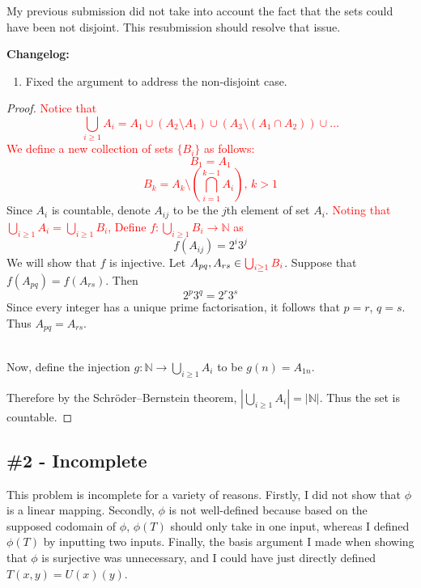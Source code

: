 \documentclass{article}
\theoremstyle{plain} %
\numberwithin{thm}{section} %
\theoremstyle{definition}
\begin{document}
    \smallskip

    \noindent My previous submission did not take into account the fact that the sets could have been not disjoint. This resubmission should resolve that issue.


    \noindent\textbf{Changelog:}\begin{enumerate}
        \item Fixed the argument to address the non-disjoint case.
    \end{enumerate}

    \begin{proof}
        \textcolor{red}{Notice that \[\bigcup_{i \ge 1} A_i = A_1 \cup (A_2 \setminus A_1) \cup (A_3 \setminus (A_1 \cap A_2)) \cup \dots\] We define a new collection of sets \(\{B_i\}\) as follows:}
        \textcolor{red}{
            \[
                B_1 = A_1
            \] 
            \[
                B_k = A_k \setminus \left(\bigcap_{i=1}^{k-1} A_i\right) \text{, } k>1
            \]
        }
        Since \(A_i\) is countable, denote \(A_{ij}\) to be the \(j\)th element of set \(A_i\). \textcolor{red}{Noting that \(\bigcup_{i \ge 1} A_i = \bigcup_{i \ge 1} B_i\), Define \(f: \bigcup_{i \ge 1} B_i \to \mathbb{N}\) as }
        \[
            f(A_{ij})=2^{i}3^{j}
        \]
        We will show that \(f\) is injective. Let \(A_{pq}, A_{rs} \in \textcolor{red}{\bigcup_{i \geq 1} B_i}\). Suppose that \(f(A_{pq} ) = f(A_{rs} )\). Then
        \[
            2^p 3^q = 2^r 3^s
        \]
        Since every integer has a unique prime factorisation, it follows that \(p = r\), \(q = s\). Thus \(A_{pq} = A_{rs} \).

        \noindent \\ Now, define the injection \(g: \mathbb{N} \to \bigcup_{i\geq 1} A_i\) to be \(g(n) = A_{1n} \). 
        
        \noindent Therefore by the Schröder–Bernstein theorem, \(|\bigcup_{i\geq 1} A_i | = |\mathbb{N} |\). Thus the set is countable.

    \end{proof}

    \subsection{\#2 - Incomplete}

    This problem is incomplete for a variety of reasons. Firstly, I did not show that \(\phi\) is a linear mapping. Secondly, \(\phi\) is not well-defined because based on the supposed codomain of \(\phi\), \(\phi (T)\) should only take in one input, whereas I defined \(\phi (T)\) by inputting two inputs. Finally, the basis argument I made when showing that \(\phi\) is surjective was unnecessary, and I could have just directly defined \(T(x,y) = U(x)(y)\).
\end{document}
